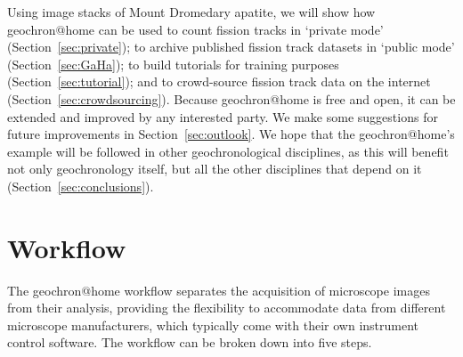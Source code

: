 \documentclass[gchron, manuscript]{copernicus}
\begin{document}
Using image stacks of Mount Dromedary apatite, we will show how
geochron@home can be used to count fission tracks in `private mode'
(Section~\ref{sec:private}); to archive published fission track
datasets in `public mode' (Section~\ref{sec:GaHa}); to build tutorials
for training purposes (Section~\ref{sec:tutorial}); and to
crowd-source fission track data on the internet
(Section~\ref{sec:crowdsourcing}). Because geochron@home is free and
open, it can be extended and improved by any interested party. We make
some suggestions for future improvements in
Section~\ref{sec:outlook}. We hope that the geochron@home's example
will be followed in other geochronological disciplines, as this will
benefit not only geochronology itself, but all the other disciplines
that depend on it (Section~\ref{sec:conclusions}).

\section{Workflow}\label{sec:architecture}

The geochron@home workflow separates the acquisition of
microscope images from their analysis, providing the flexibility to
accommodate data from different microscope manufacturers, which
typically come with their own instrument control software. The
workflow can be broken down into five steps.
\end{document}
